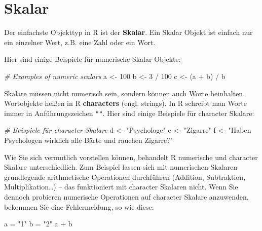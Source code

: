\documentclass[
]{book}
\newenvironment{Shaded}{\begin{snugshade}}{\end{snugshade}}
\newcommand{\CommentTok}[1]{\textcolor[rgb]{0.56,0.35,0.01}{\textit{#1}}}
\newcommand{\DecValTok}[1]{\textcolor[rgb]{0.00,0.00,0.81}{#1}}
\newcommand{\NormalTok}[1]{#1}
\newcommand{\OtherTok}[1]{\textcolor[rgb]{0.56,0.35,0.01}{#1}}
\newcommand{\SpecialCharTok}[1]{\textcolor[rgb]{0.00,0.00,0.00}{#1}}
\newcommand{\StringTok}[1]{\textcolor[rgb]{0.31,0.60,0.02}{#1}}
\begin{document}
\hypertarget{skalar}{%
\section{Skalar}\label{skalar}}

Der einfachste Objekttyp in R ist der \textbf{Skalar}. Ein Skalar Objekt ist einfach nur ein einzelner Wert, z.B. eine Zahl oder ein Wort.

Hier sind einige Beispiele für numerische Skalar Objekte:

\begin{Shaded}
\begin{Highlighting}[]
\CommentTok{\# Examples of numeric scalars}
\NormalTok{a }\OtherTok{\textless{}{-}} \DecValTok{100}
\NormalTok{b }\OtherTok{\textless{}{-}} \DecValTok{3} \SpecialCharTok{/} \DecValTok{100}
\NormalTok{c }\OtherTok{\textless{}{-}}\NormalTok{ (a }\SpecialCharTok{+}\NormalTok{ b) }\SpecialCharTok{/}\NormalTok{ b}
\end{Highlighting}
\end{Shaded}

Skalare müssen nicht numerisch sein, sondern können auch Worte beinhalten. Wortobjekte heißen in R \textbf{characters} (engl. strings). In R schreibt man Worte immer in Anführungszeichen \texttt{""}. Hier sind einige Beispiele für character Skalare:

\begin{Shaded}
\begin{Highlighting}[]
\CommentTok{\# Beispiele für character Skalare}
\NormalTok{d }\OtherTok{\textless{}{-}} \StringTok{"Psychologe"}
\NormalTok{e }\OtherTok{\textless{}{-}} \StringTok{"Zigarre"}
\NormalTok{f }\OtherTok{\textless{}{-}} \StringTok{"Haben Psychologen wirklich alle Bärte und rauchen Zigarre?"}
\end{Highlighting}
\end{Shaded}

Wie Sie sich vermutlich vorstellen können, behandelt R numerische und character Skalare unterschiedlich. Zum Beispiel lassen sich mit numerischen Skalaren grundlegende arithmetische Operationen durchführen (Addition, Subtraktion, Multiplikation\ldots) -- das funktioniert mit character Skalaren nicht.
Wenn Sie dennoch probieren numerische Operationen auf character Skalare anzuwenden, bekommen Sie eine Fehlermeldung, so wie diese:

\begin{Shaded}
\begin{Highlighting}[]
\NormalTok{a }\OtherTok{=} \StringTok{"1"}
\NormalTok{b }\OtherTok{=} \StringTok{"2"}
\NormalTok{a }\SpecialCharTok{+}\NormalTok{ b}
\end{Highlighting}
\end{Shaded}
\end{document}
